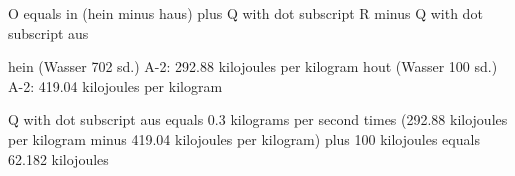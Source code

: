 O equals in (hein minus haus) plus Q with dot subscript R minus Q with dot subscript aus

hein (Wasser 702 sd.) A-2: 292.88 kilojoules per kilogram  
hout (Wasser 100 sd.) A-2: 419.04 kilojoules per kilogram  

Q with dot subscript aus equals 0.3 kilograms per second times (292.88 kilojoules per kilogram minus 419.04 kilojoules per kilogram) plus 100 kilojoules  
equals 62.182 kilojoules